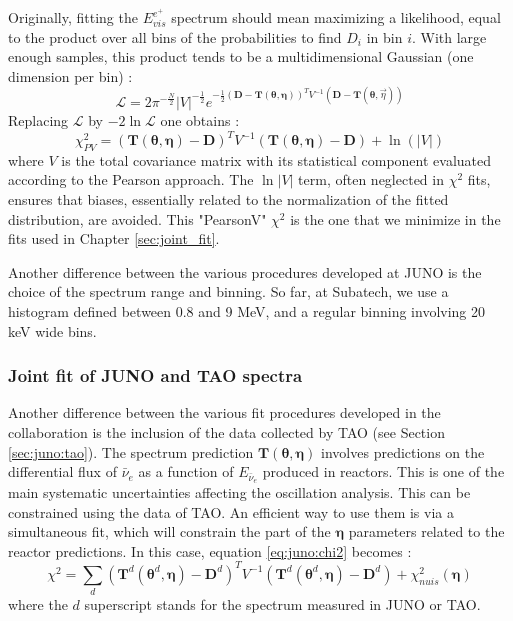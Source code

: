 \documentclass[../main.tex]{subfiles}
\begin{document}
Originally, fitting the $E^{e^+}_{vis}$ spectrum should mean maximizing a likelihood, equal to the product over all bins of the probabilities to find $D_i$ in bin $i$. With large enough samples, this product tends to be a multidimensional Gaussian (one dimension per bin) :
\begin{equation}
  \mathcal{L} = 2\pi^{-\frac{N}{2}} |V|^{-\frac{1}{2}}  e^{-\frac{1}{2}\left(\bm{D}-\bm{T}(\bm{\theta},\bm{\eta})\right)^T V^{-1} \left( \bm{D}-\bm{T}(\bm{\theta},\vec{\eta}) \right)}
\end{equation}
Replacing $\mathcal{L}$ by $-2 \ln \mathcal{L}$ one obtains :
\begin{equation}
\chi^2_{PV} = \left(\bm{T}(\bm{\theta},\bm{\eta}) - \bm{D} \right)^T V^{-1} \left(\bm{T}(\bm{\theta},\bm{\eta}) - \bm{D}  \right) + \ln(|V|)
\end{equation}
where $V$ is the total covariance matrix with its statistical component evaluated according to the Pearson approach. The $\ln|V|$ term, often neglected in $\chi^2$ fits, ensures that biases, essentially related to the normalization of the fitted distribution, are avoided. This "PearsonV" $\chi^2$ is the one that we minimize in the fits used in Chapter \ref{sec:joint_fit}.

Another difference between the various procedures developed at JUNO is the choice of the spectrum range and binning. So far, at Subatech, we use a histogram defined between 0.8 and 9 MeV, and a regular binning involving 20 keV wide bins.

\subsubsection{Joint fit of JUNO and TAO spectra}

Another difference between the various fit procedures developed in the collaboration is the inclusion of the data collected by TAO (see Section \ref{sec:juno:tao}). The spectrum prediction $\bm{T}(\bm{\theta},\bm{\eta})$ involves predictions on the differential flux of $\bar{\nu}_e$ as a function of $E_{\bar{\nu}_e}$ produced in reactors. This is one of the main systematic uncertainties affecting the oscillation analysis. This can be constrained using the data of TAO. An efficient way to use them is via a simultaneous fit, which will constrain the part of the $\bm{\eta}$ parameters related to the reactor predictions. In this case, equation \ref{eq:juno:chi2} becomes :
\begin{equation}
  \chi^2 = \sum_{d}\left(\bm{T}^d(\bm{\theta}^d,\bm{\eta}) - \bm{D}^d  \right)^T V^{-1} \left(\bm{T}^d(\bm{\theta}^d,\bm{\eta}) - \bm{D}^d  \right) +  \chi^2_{nuis}(\bm{\eta})
\end{equation}
where the $d$ superscript stands for the spectrum measured in JUNO or TAO.
\end{document}
